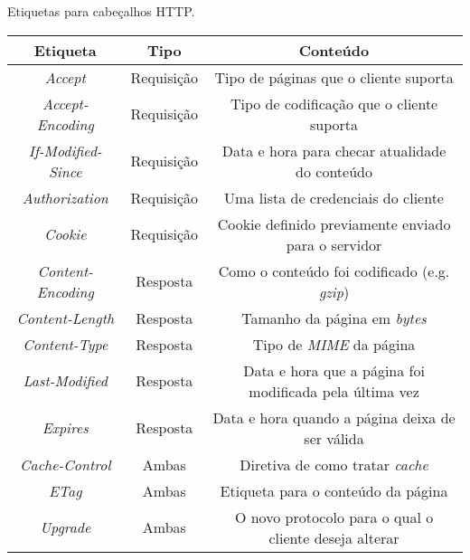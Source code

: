\begin{quadro}[!htb]
	\centering
	\caption{Etiquetas para cabeçalhos HTTP.\label{qua:cabecalhoshttp}}
	\begin{tabular}{| c | c | c |}
		\hline
		\textbf{Etiqueta} & \textbf{Tipo} & \textbf{Conteúdo}                                       \\
		\hline
		\textit{Accept}             & Requisição    & Tipo de páginas que o cliente suporta                   \\
		\hline
		\textit{Accept-Encoding}    & Requisição    & Tipo de codificação que o cliente suporta               \\
		\hline
		\textit{If-Modified-Since}  & Requisição    & Data e hora para checar atualidade do conteúdo          \\
		\hline
		\textit{Authorization}      & Requisição    & Uma lista de credenciais do cliente                      \\
		\hline
		\textit{Cookie}             & Requisição    & Cookie definido previamente enviado para o servidor     \\
		\hline
		\textit{Content-Encoding}   & Resposta      & Como o conteúdo foi codificado (e.g. \textit{gzip})               \\
		\hline
		\textit{Content-Length}     & Resposta      & Tamanho da página em \textit{bytes}                              \\
		\hline
		\textit{Content-Type}       & Resposta      & Tipo de \textit{MIME} da página                                  \\
		\hline
		\textit{Last-Modified}      & Resposta      & Data e hora que a página foi modificada pela última vez \\
		\hline
		\textit{Expires}            & Resposta      & Data e hora quando a página deixa de ser válida         \\
		\hline
		\textit{Cache-Control}      & Ambas          & Diretiva de como tratar \textit{cache}                           \\
		\hline
		\textit{ETag}               & Ambas          & Etiqueta para o conteúdo da página                      \\
		\hline
		\textit{Upgrade}            & Ambas          & O novo protocolo para o qual o cliente deseja alterar        \\	
		\hline
	\end{tabular}
\end{quadro}